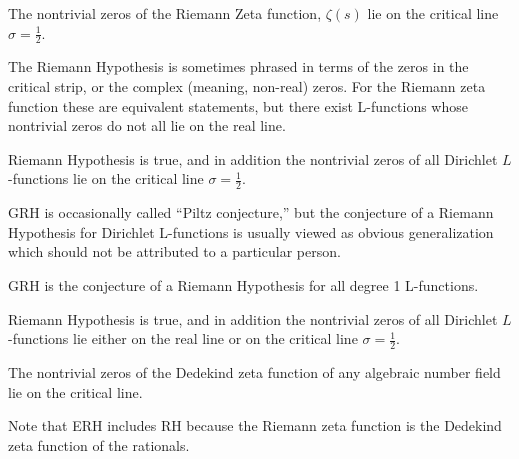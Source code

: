 \documentclass[12pt,letterpaper, reqno]{amsart}
\begin{document}
\begin{problemblock}
\begin{problem}[1.1] The nontrivial zeros of the Riemann Zeta function,
$\zeta(s)$ lie on the critical line $\sigma=\frac12$.
\end{problem}

\begin{distinguishedremark}
The Riemann Hypothesis is sometimes phrased in terms of the
zeros in the critical strip, or the
complex (meaning, non-real) zeros.  For the Riemann zeta function
these are equivalent statements, but there exist L-functions
whose nontrivial zeros do not all lie on the real line. 
\end{distinguishedremark}

\end{problemblock}

\begin{problemblock}
\begin{problem}[1.2]
Riemann Hypothesis is true, and in addition the
nontrivial zeros of
all Dirichlet $L$-functions
lie on the critical line $\sigma=\frac12$.
\end{problem}

\begin{remark}GRH is occasionally called ``Piltz conjecture,'' but the
conjecture of a Riemann Hypothesis for Dirichlet L-functions is
usually viewed as obvious generalization which should not
be attributed to a particular person.
\end{remark}

\begin{remark}GRH is the conjecture of a Riemann Hypothesis for
all degree 1 L-functions.
\end{remark}
\end{problemblock}

\begin{problemblock}
\begin{problem}[1.3]
Riemann Hypothesis is true, and in addition the
nontrivial zeros of
all Dirichlet $L$-functions
lie either on the real line or on the critical line $\sigma=\frac12$.
\end{problem}
\end{problemblock}


\begin{problemblock}
\begin{problem}[1.4]
The nontrivial zeros of the Dedekind zeta function
of any algebraic number field lie on the critical line.
\end{problem}


\begin{distinguishedremark}
Note that ERH includes RH because the Riemann zeta function is
the Dedekind zeta function of the rationals.
\end{distinguishedremark}

\end{problemblock}
\end{document}
